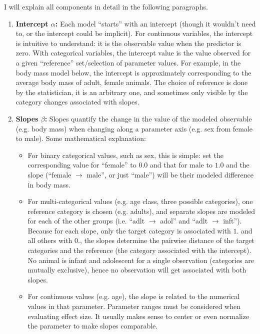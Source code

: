 I will explain all components in detail in the following paragraphs.

\begin{enumerate}
\item \textbf{Intercept \(\alpha\):}
\label{sec:org034f04c}
Each model ``starts'' with an intercept (though it wouldn't need to, or the intercept could be implicit).
For continuous variables, the intercept is intuitive to understand: it is the observable value when the predictor is zero.
With categorical variables, the intercept value is the value observed for a given ``reference'' set/selection of parameter values.
For example, in the body mass model below, the intercept is approximately corresponding to the average body mass of adult, female animals.
The choice of reference is done by the statistician, it is an arbitrary one, and sometimes only visible by the category changes associated with slopes.

\item \textbf{Slopes \(\beta\):}
\label{sec:org2c291e4}
Slopes quantify the change in the value of the modeled observable (e.g. body mass) when changing along a parameter axis (e.g. sex from female to male).
Some mathematical explanation:
\begin{itemize}
\item For binary categorical values, such as sex, this is simple: set the corresponding value for ``female'' to \(0.0\) and that for male to \(1.0\) and the slope (``female \(\rightarrow\) male'', or just ``male'') will be their modeled difference in body mass.
\item For multi-categorical values (e.g. age class, three possible categories), one reference category is chosen (e.g. adults), and separate slopes are modeled for each of the other groups (i.e. ``adlt \(\rightarrow\) adol'' and ``adlt \(\rightarrow\) inft''). Because for each slope, only the target category is associated with \(1.\) and all others with \(0.\), the slopes determine the pairwise distance of the target categories and the reference (the category associated with the intercept). No animal is infant and adolescent for a single observation (categories are mutually exclusive), hence no observation will get associated with both slopes.
\item For continuous values (e.g. age), the slope is related to the numerical values in that parameter. Parameter ranges must be considered when evaluating effect size. It usually makes sense to center or even normalize the parameter to make slopes comparable.
\end{itemize}


\end{enumerate}
